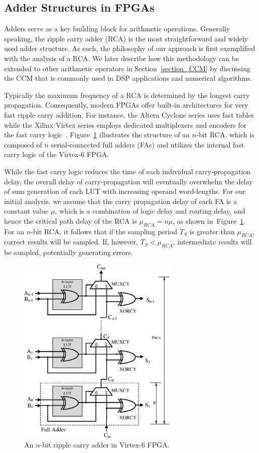\documentclass[journal]{IEEEtran}
\begin{document}
\subsection{Adder Structures in FPGAs}
Adders serve as a key building block for arithmetic operations. Generally speaking, the ripple carry adder (RCA) is the most straightforward and widely used adder structure. As such, the philosophy of our approach is first exemplified with the analysis of a RCA. We later describe how this methodology can be extended to other arithmetic operators in Section~\ref{section_CCM} by discussing  the CCM that is commonly used in DSP applications and numerical algorithms.

Typically the maximum frequency of a RCA is determined by the longest carry propagation. Consequently, modern FPGAs offer built-in architectures for very fast ripple carry addition. For instance, the Altera Cyclone series uses fast tables~\cite{AlteraCyclone} while the Xilinx Virtex series employs dedicated multiplexers and encoders for the fast carry logic~\cite{Virtex6}. Figure~\ref{FPGA adder} illustrates the structure of an $n$-bit RCA, which is composed of $n$ serial-connected full adders (FAs) and utilizes the internal fast carry logic of the Virtex-6 FPGA.

While the fast carry logic reduces the time of each individual carry-propagation delay, the overall delay of carry-propagation will eventually overwhelm the delay of sum generation of each LUT with increasing operand word-lengths. For our initial analysis, we assume that the carry propagation delay of each FA is a constant value $\mu$, which is a combination of logic delay and routing delay, and hence the critical path delay of the RCA is $\mu_{RCA}=n\mu$, as shown in~Figure~\ref{FPGA adder}. For an $n$-bit RCA, it follows that if the sampling period $T_S$ is greater than $\mu_{RCA}$, correct results will be sampled. If, however, $T_S<\mu_{RCA}$, intermediate results will be sampled, potentially generating errors.
%
\begin{figure}[t]
  \centering
  \includegraphics[width=3in]{./Figures/FastCarryLogic3.eps}
  \caption{An $n$-bit ripple carry adder in Virtex-6 FPGA.}
  \label{FPGA adder}
\end{figure}
\end{document}
